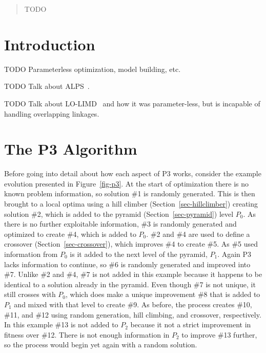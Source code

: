 \documentclass{sig-alternate}
\begin{document}
\maketitle
\begin{abstract}
TODO
\end{abstract}




\section{Introduction}
TODO Parameterless optimization, model building, etc.

TODO Talk about ALPS~\cite{hornby:2006:alps}.

TODO Talk about LO-LIMD~\cite{posik:2011:parameterless} and how it was parameter-less,
but is incapable of handling overlapping linkages.

\section{The P3 Algorithm}
\label{sec-p3}
Before going into detail about how each aspect of P3 works, consider the example
evolution presented in Figure~\ref{fig-p3}.  At the start of optimization there
is no known problem information, so solution \#1 is randomly generated.  This
is then brought to a local optima using a hill climber (Section~\ref{sec-hillclimber})
creating solution \#2, which is added to the pyramid (Section~\ref{sec-pyramid}) level
$P_0$.  As there is no further exploitable information, \#3 is randomly generated
and optimized to create \#4, which is added to $P_0$.  \#2 and \#4 are used to
define a crossover (Section~\ref{sec-crossover}), which improves \#4 to create
\#5. As \#5 used information from $P_0$ is it added to the next level of the pyramid, $P_1$.
Again P3 lacks information to continue, so \#6 is randomly generated and improved into
\#7.  Unlike \#2 and \#4, \#7 is not added in this example because it happens to be identical to
a solution already in the pyramid.  Even though \#7 is not unique, it still crosses with
$P_0$, which does make a unique improvement \#8 that is added to $P_1$ and mixed with that
level to create \#9.  As before, the process creates \#10, \#11, and \#12 using
random generation, hill climbing, and crossover, respectively.  In this example \#13
is not added to $P_2$ because it not a strict improvement in fitness over \#12.  There
is not enough information in $P_2$ to improve \#13 further, so the process would begin
yet again with a random solution.
\end{document}
